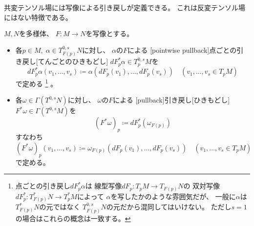 \documentclass[report]{jlreq}
\begin{document}
共変テンソル場には{\smooth}写像による引き戻しが定義できる。
これは反変テンソル場にはない特徴である。

\begin{definition}[共変テンソル場の引き戻し]
    $M, N$を多様体、
    $F \colon M \to N$を{\smooth}写像とする。
    \begin{itemize}
        \item 各$p \in M, \; \alpha \in T_{F(p)}^{0, s} N$に対し、
            $\alpha$の$F$による
            [pointwise pullback]{点ごとの引き戻し}[てんごとのひきもどし]
            $dF_p^* \alpha \in T_p^{0, s} M$を
            \begin{equation}
                dF_p^* \alpha (v_1, \dots, v_s)
                    \coloneqq \alpha (dF_p (v_1), \dots, dF_p (v_s))
                    \quad (v_1, \dots, v_s \in T_p M)
            \end{equation}
            で定める
            \footnote{
                点ごとの引き戻し$dF_p^* \alpha$は
                線型写像$dF_p \colon T_pM \to T_{F(p)}N$の
                双対写像$dF_p^* \colon T_{F(p)}^*N \to T_p^*M$によって
                $\alpha$を写したかのような雰囲気だが、
                一般に$\alpha$は$T_{F(p)}^*N$の元ではなく
                $T_{F(p)}^{0, s}N$の元だから混同してはいけない。
                ただし$s = 1$の場合はこれらの概念は一致する。
            }
            。
        \item 各$\omega \in \Gamma(T^{0, s} N)$に対し、
            $\omega$の$F$による
            [pullback]{引き戻し}[ひきもどし]
            $F^* \omega \in \Gamma(T^{0, s} M)$を
            \begin{equation}
                (F^* \omega)_p
                    \coloneqq dF_p^* (\omega_{F(p)})
            \end{equation}
            すなわち
            \begin{equation}
                (F^* \omega)_p (v_1, \dots, v_s)
                    \coloneqq \omega_{F(p)} (dF_p (v_1), \dots, dF_p (v_s))
                    \quad (v_1, \dots, v_s \in T_p M)
            \end{equation}
            で定める。
    \end{itemize}
\end{definition}

\end{document}
